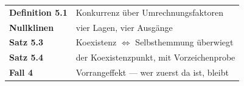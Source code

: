\begin{merksatz}
\begin{center}
\renewcommand{\arraystretch}{1.5}
\begin{tabular}{@{}P{3.0cm}P{5.6cm}@{}}
\toprule
\textbf{Definition 5.1} & Konkurrenz über Umrechnungsfaktoren\\
\textbf{Nullklinen} & vier Lagen, vier Ausgänge\\
\textbf{Satz 5.3} & Koexistenz $\iff$ Selbsthemmung überwiegt\\
\textbf{Satz 5.4} & der Koexistenzpunkt, mit Vorzeichenprobe\\
\textbf{Fall 4} & Vorrangeffekt --- wer zuerst da ist, bleibt\\
\bottomrule
\end{tabular}
\end{center}

\begin{center}
\begin{minipage}{0.88\textwidth}
\end{minipage}
\end{center}
\end{merksatz}
